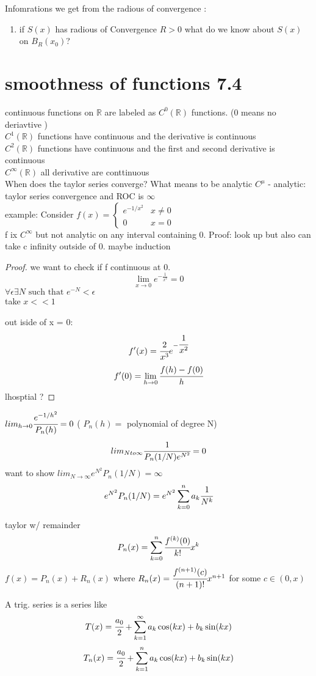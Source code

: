 \documentclass{article}
\begin{document}
Infomrations we get from the radious of convergence :
\begin{enumerate}
    \item if $S(x)$ has radious of Convergence $R>0$ what do we know about $S(x) $ on $B_R(x_0)$? 
\end{enumerate}


\section{smoothness of functions 7.4}
continuous functions on $\mathbb{R}$ are labeled as $C^0(\mathbb{R})$ functions. (0 means no deriavtive )\\
$C^1(\mathbb{R})$ functions have continuous and the derivative is continuous \\ 
$C^2(\mathbb{R})$ functions have continuous and the first and second derivative is continuous \\
$C^{\infty}(\mathbb{R})$ all derivative are conttinuous\\ 

When does the taylor series converge? What means to be analytic 
$C^{\mu}$ - analytic: taylor series convergence and ROC is $\infty$\\ 
example: Consider 
$f(x) = \begin{cases}
    e^{-1/x^2} & x \neq 0 \\
    0 & x = 0
\end{cases}$ \\ 

f ix $C^{\infty}$ but not analytic on any interval containing 0. Proof: look up but also can take c infinity outside of 0. maybe induction 
\begin{proof}
    we want to check if f continuous at 0. 
    $$\lim_{x \to 0}e^{-\frac{1}{x^2}} = 0$$ 
    $\forall \epsilon \exists N \text{ such that } e^{-N} < \epsilon$\\ take $x << 1$ 

    out iside of x = 0: 
    $$f'(x) = \cfrac{2}{x^3}e^{-\cfrac{1}{x^2}}$$
    $$f'(0) = \lim_{h \to 0} \cfrac{f(h) - f(0)}{h}$$  lhosptial ?
\end{proof}


\begin{lemma}
    $lim_{h \to 0} \cfrac{e^{-1/h^2}}{P_n(h)} = 0$ (    $P_n(h) = $ polynomial of degree N)
    $$lim_{N to \infty} \cfrac{1}{P_n(1/N)e^{N^2}} = 0$$ want to show 
    $lim_{N\to \infty} e^{N^2}P_n(1/N) = \infty$
    $$e^{N^2}P_n(1/N) = e^{N^2} \sum_{k=0}^{n} a_k \cfrac{1}{N^k}$$
\end{lemma}


\begin{theorem}
    taylor w/ remainder
    $$P_n(x) = \sum_{k=0}^{n} \cfrac{f^{(k)}(0)}{k!}x^k$$ 
    $f(x) = P_n(x) + R_n(x)$ where $R_n(x) = \cfrac{f^{(n+1)}(c)}{(n+1)!}x^{n+1}$ for some $c \in (0,x)$
\end{theorem}

\begin{definition}
    A trig. series is a series like 
    $$T(x) = \cfrac{a_0}{2} + \sum_{k=1}^{\infty} a_k \cos(kx) + b_k \sin(kx)$$
    $$T_n(x) = \cfrac{a_0}{2} + \sum_{k=1}^{n} a_k \cos(kx) + b_k \sin(kx)$$
\end{definition}
\end{document}
